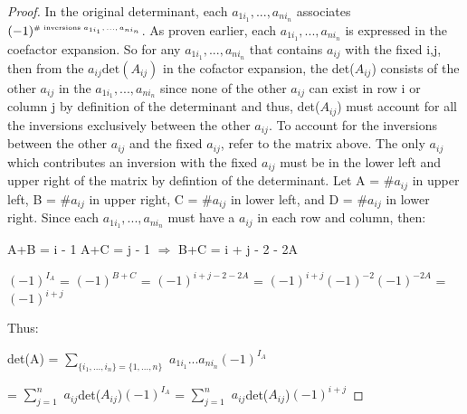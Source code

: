 \begin{proof}
        In the original determinant, each $a_{1i_1},...,a_{ni_n}$ associates
        $(-1)^{\text{\tiny \# inversions $a_{1i_1},...,a_{ni_n}$}}$.
        As proven earlier, each $a_{1i_1},...,a_{ni_n}$ is expressed
        in the coefactor expansion.
        So for any $a_{1i_1},...,a_{ni_n}$ that contains $a_{ij}$ with the
        fixed i,j, then from the $a_{ij}\text{det}(A_{ij})$ in the
        cofactor expansion, the det($A_{ij}$)
        consists of the other $a_{ij}$ in the $a_{1i_1},...,a_{ni_n}$
        since none of the other $a_{ij}$ can exist in row i or column j
        by definition of the determinant and thus, det($A_{ij}$) must account
        for all the inversions exclusively between the other $a_{ij}$.
        To account for the inversions between the other $a_{ij}$
        and the fixed $a_{ij}$, refer to the matrix above.
        The only $a_{ij}$ which contributes an inversion with the fixed $a_{ij}$
        must be in the lower left and upper right of the matrix
        by defintion of the determinant.
        Let A = \#$a_{ij}$ in upper left, B = \#$a_{ij}$ in upper right,
        C = \#$a_{ij}$ in lower left, and D = \#$a_{ij}$ in lower right.
        Since each $a_{1i_1},...,a_{ni_n}$
        must have a $a_{ij}$ in each row and column, then:

        \hspace{0.5cm}
        A+B = i - 1
        \hspace{1cm}
        A+C = j - 1
        \hspace{1cm}
        $\Rightarrow$
        \hspace{1cm}
        B+C = i + j - 2 - 2A

        \hspace{0.5cm}
        $(-1)^{I_A}$ = $(-1)^{B+C}$ = $(-1)^{i+j-2-2A}$
        = $(-1)^{i+j}(-1)^{-2}(-1)^{-2A}$
        = $(-1)^{i+j}$

        Thus:

        \hspace{0.5cm}
        det(A)
        = $\sum_{\{i_1,...,i_n\} = \{1,...,n\}}$
            $a_{1i_1}...a_{ni_n}(-1)^{I_A}$

        \hspace{1.8cm}
        = $\sum_{j=1}^n$ $a_{ij}$det($A_{ij}$)$(-1)^{I_A}$
        = $\sum_{j=1}^n$ $a_{ij}$det($A_{ij}$)$(-1)^{i+j}$
    \end{proof}

    \newpage





